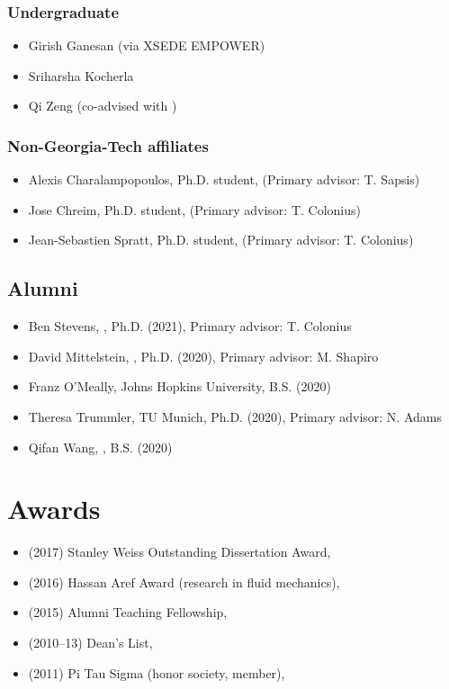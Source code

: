 \subsubsection{Undergraduate}
\begin{itemize}
    \item Girish Ganesan (via XSEDE EMPOWER)
    \item Sriharsha Kocherla
    \item Qi Zeng (co-advised with \Florian)
\end{itemize}

\subsubsection{Non-Georgia-Tech affiliates}
\begin{itemize}
    \item Alexis Charalampopoulos, Ph.D. student, \MIT (Primary advisor: T. Sapsis)
    \item Jose Chreim, Ph.D. student, \CIT (Primary advisor: T. Colonius)
    \item Jean-Sebastien Spratt, Ph.D. student, \CIT (Primary advisor: T. Colonius)
\end{itemize}

\subsection{Alumni}

\begin{itemize}
    \item Ben Stevens, \CIT, Ph.D. (2021), Primary advisor: T. Colonius
    \item David Mittelstein, \CIT, Ph.D. (2020), Primary advisor: M. Shapiro
    \item Franz O'Meally, Johns Hopkins University, B.S. (2020)
    \item Theresa Trummler, TU Munich, Ph.D. (2020), Primary advisor: N. Adams
    \item Qifan Wang, \CIT, B.S. (2020)
\end{itemize}

\section{Awards}

\begin{itemize}
    \item (2017) Stanley Weiss Outstanding Dissertation Award, \UIUC
    \item (2016) Hassan Aref Award (research in fluid mechanics), \UIUC
    \item (2015) Alumni Teaching Fellowship, \UIUC
    \item (2010--13) Dean's List, \UMD
    \item (2011) Pi Tau Sigma (honor society, member), \UMD
\end{itemize}

